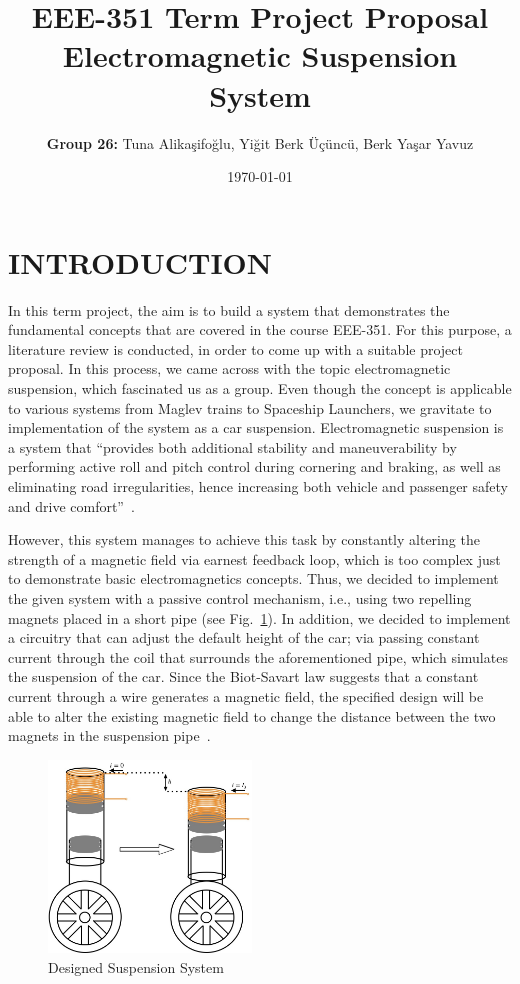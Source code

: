 \documentclass[a4paper, 11pt, conference]{IEEEtran}
\title{EEE-351 Term Project Proposal \\ Electromagnetic Suspension System}
\author{\textbf{Group 26:} Tuna Alikaşifoğlu, Yiğit Berk Üçüncü, Berk Yaşar Yavuz}
\date{\today}
\begin{document}
\maketitle

\section{INTRODUCTION}
In this term project, the aim is to build a system that demonstrates the fundamental concepts that are covered in the course EEE-351. For this purpose, a literature review is conducted, in order to come up with a suitable project proposal. In this process, we came across with the topic electromagnetic suspension, which fascinated us as a group. Even though the concept is applicable to various systems from Maglev trains to Spaceship Launchers, we gravitate to implementation of the system as a car suspension. Electromagnetic suspension is a system that ``provides both additional stability and maneuverability by performing active roll and pitch control during cornering and braking, as well as eliminating road irregularities, hence increasing both vehicle and passenger safety and drive comfort''~\autocite{active_suspension}.

However, this system manages to achieve this task by constantly altering the strength of a magnetic field via earnest feedback loop, which is too complex just to demonstrate basic electromagnetics concepts. Thus, we decided to implement the given system with a passive control mechanism, i.e., using two repelling magnets placed in a short pipe (see Fig.~\ref{fig:suspension}). In addition, we decided to implement a circuitry that can adjust the default height of the car; via passing constant current through the coil that surrounds the aforementioned pipe, which simulates the suspension of the car. Since the Biot-Savart law suggests that a constant current through a wire generates a magnetic field, the specified design will be able to alter the existing magnetic field to change the distance between the two magnets in the suspension pipe~\autocite{emt_textbook}.
\begin{figure}[ht]
    \centering
    \includegraphics[width=0.48\textwidth, height=0.25\textheight, keepaspectratio]{suspension.jpeg}
    \caption{Designed Suspension System}\label{fig:suspension}
\end{figure}
\end{document}
